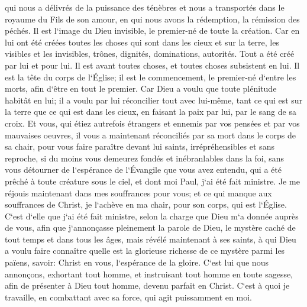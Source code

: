 \verse qui nous a délivrés de la puissance des ténèbres et nous a transportés dans le royaume du Fils de son amour, 
\verse en qui nous avons la rédemption, la rémission des péchés. 
\verse Il est l`image du Dieu invisible, le premier-né de toute la création. 
\verse Car en lui ont été créées toutes les choses qui sont dans les cieux et sur la terre, les visibles et les invisibles, trônes, dignités, dominations, autorités. Tout a été créé par lui et pour lui. 
\verse Il est avant toutes choses, et toutes choses subsistent en lui. 
\verse Il est la tête du corps de l`Église; il est le commencement, le premier-né d`entre les morts, afin d`être en tout le premier. 
\verse Car Dieu a voulu que toute plénitude habitât en lui; 
\verse il a voulu par lui réconcilier tout avec lui-même, tant ce qui est sur la terre que ce qui est dans les cieux, en faisant la paix par lui, par le sang de sa croix. 
\verse Et vous, qui étiez autrefois étrangers et ennemis par vos pensées et par vos mauvaises oeuvres, il vous a maintenant réconciliés par sa mort dans le corps de sa chair, 
\verse pour vous faire paraître devant lui saints, irrépréhensibles et sans reproche, 
\verse si du moins vous demeurez fondés et inébranlables dans la foi, sans vous détourner de l`espérance de l`Évangile que vous avez entendu, qui a été prêché à toute créature sous le ciel, et dont moi Paul, j`ai été fait ministre. 
\verse Je me réjouis maintenant dans mes souffrances pour vous; et ce qui manque aux souffrances de Christ, je l`achève en ma chair, pour son corps, qui est l`Église. 
\verse C`est d`elle que j`ai été fait ministre, selon la charge que Dieu m`a donnée auprès de vous, afin que j`annonçasse pleinement la parole de Dieu, 
\verse le mystère caché de tout temps et dans tous les âges, mais révélé maintenant à ses saints, 
\verse à qui Dieu a voulu faire connaître quelle est la glorieuse richesse de ce mystère parmi les païens, savoir: Christ en vous, l`espérance de la gloire. 
\verse C`est lui que nous annonçons, exhortant tout homme, et instruisant tout homme en toute sagesse, afin de présenter à Dieu tout homme, devenu parfait en Christ. 
\verse C`est à quoi je travaille, en combattant avec sa force, qui agit puissamment en moi. 

